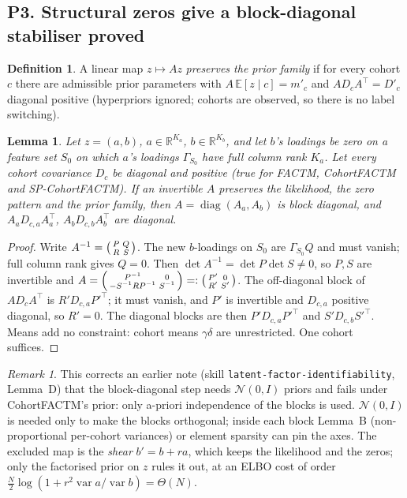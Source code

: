 \documentclass[11pt,a4paper]{article}
\newcommand{\E}{\mathbb{E}}
\newcommand{\N}{\mathcal{N}}
\newcommand{\diag}{\operatorname{diag}}
\newtheorem{lemma}{Lemma}
\theoremstyle{definition}
\newtheorem{definition}{Definition}
\theoremstyle{remark}
\newtheorem*{remark}{Remark}
\begin{document}
\subsection*{P3. Structural zeros give a block-diagonal stabiliser \hfill\textbf{proved}}
\begin{definition}
A linear map $z\mapsto Az$ \emph{preserves the prior family} if for every cohort $c$ there are admissible prior parameters
with $A\,\E[z\mid c]=m'_c$ and $AD_cA^\top=D'_c$ diagonal positive (hyperpriors ignored; cohorts are observed, so there is no
label switching).
\end{definition}
\begin{lemma}\label{lem:zeros2}
Let $z=(a,b)$, $a\in\mathbb R^{K_a}$, $b\in\mathbb R^{K_b}$, and let $b$'s loadings be zero on a feature set $S_0$ on which $a$'s
loadings $\Gamma_{S_0}$ have full column rank $K_a$. Let every cohort covariance $D_c$ be diagonal and positive (true for FACTM,
CohortFACTM and SP-CohortFACTM). If an invertible $A$ preserves the likelihood, the zero pattern and the prior family, then
$A=\diag(A_a,A_b)$ is block diagonal, and $A_aD_{c,a}A_a^\top$, $A_bD_{c,b}A_b^\top$ are diagonal.
\end{lemma}
\begin{proof}
Write $A^{-1}=\begin{psmallmatrix}P&Q\\R&S\end{psmallmatrix}$. The new $b$-loadings on $S_0$ are $\Gamma_{S_0}Q$ and must vanish; full column rank gives
$Q=0$. Then $\det A^{-1}=\det P\det S\neq0$, so $P,S$ are invertible and
$A=\begin{psmallmatrix}P^{-1}&0\\-S^{-1}RP^{-1}&S^{-1}\end{psmallmatrix}=:\begin{psmallmatrix}P'&0\\R'&S'\end{psmallmatrix}$. The off-diagonal block of $AD_cA^\top$ is $R'D_{c,a}P'^\top$;
it must vanish, and $P'$ is invertible and $D_{c,a}$ positive diagonal, so $R'=0$. The diagonal blocks are then
$P'D_{c,a}P'^\top$ and $S'D_{c,b}S'^\top$. Means add no constraint: cohort means $\gamma\delta$ are unrestricted. One cohort
suffices. \qedhere
\end{proof}
\begin{remark}
This corrects an earlier note (skill \texttt{latent-factor-identifiability}, Lemma~D) that the block-diagonal step
needs $\N(0,I)$ priors and fails under CohortFACTM's prior: only a-priori independence of the blocks is used. $\N(0,I)$ is
needed only to make the blocks orthogonal; inside each block Lemma~B (non-proportional per-cohort variances) or element
sparsity can pin the axes. The excluded map is the \emph{shear} $b'=b+ra$, which keeps the likelihood and the zeros;
only the factorised prior on $z$ rules it out, at an ELBO cost of order $\tfrac N2\log(1+r^2\operatorname{var}a/\operatorname{var}b)=\Theta(N)$.
\end{remark}
\end{document}
